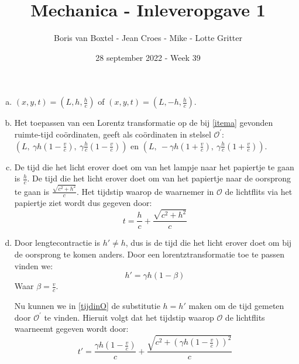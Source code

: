 \documentclass[12pt, a4paper]{article}
\begin{document}
\title{Mechanica - Inleveropgave 1}
\author{Boris van Boxtel - Jean Croes - Mike - Lotte Gritter}
\date{28 september 2022 - Week 39}

\maketitle
{}

\begin{enumerate}[(a).]
    \item \label{itema}
    $(x,y, t) = (L ,h ,\frac{h}{c})$ of $(x,y, t) = (L ,-h ,\frac{h}{c})$.

    \item
    Het toepassen van een Lorentz transformatie op de bij \ref{itema} 
    gevonden ruimte-tijd coördinaten, 
    geeft als coördinaten in stelsel $\mathcal{O}^{'}$:
    $(L,\: \gamma h(1-\frac{v}{c}),\: \gamma \frac{h}{c}(1-\frac{v}{c}))$ en 
    $(L, \:-\gamma h(1+\frac{v}{c}), \: \gamma \frac{h}{c}(1+\frac{v}{c}))$.

    \item 
    De tijd die het licht erover doet om van het lampje naar het papiertje 
    te gaan is $\frac{h}{c}$. De tijd die het licht erover doet om van het papiertje 
    naar de oorsprong te gaan is $\frac{\sqrt{c^2 + h^2}}{c}$. 
    Het tijdstip waarop de waarnemer in $\mathcal{O}$ de lichtflits via 
    het papiertje ziet wordt dus gegeven door:
    \begin{equation} \label{tijdinO} 
        t = \frac{h}{c} + \frac{\sqrt{c^2 + h^2}}{c} 
    \end{equation}

    \item \label{itemd}
    Door lengtecontractie is $h' \neq h$, dus is de tijd die het licht erover doet 
    om bij de oorsprong te komen anders. Door een lorentztransformatie toe te passen
    vinden we:
    \begin{equation} \label{lorentzh}
        h' = \gamma h\left( 1-\beta\right) 
    \end{equation}
    Waar $\beta = \frac{v}{c}$.

    Nu kunnen we in \eqref{tijdinO} de substitutie $h = h'$ maken om de tijd 
    gemeten door $\mathcal{O}^{'}$ te vinden. Hieruit volgt dat het tijdstip 
    waarop $\mathcal{O}$ de lichtflits waarneemt gegeven wordt door:
    \begin{equation} \label{tijdinO'} 
        t' = \frac{\gamma h\left( 1-\frac{v}{c}\right)}{c} + 
        \frac{\sqrt{c^2 + (\gamma h\left( 1-\frac{v}{c}\right))^2}}{c}
    \end{equation}


\end{enumerate}
\end{document}
